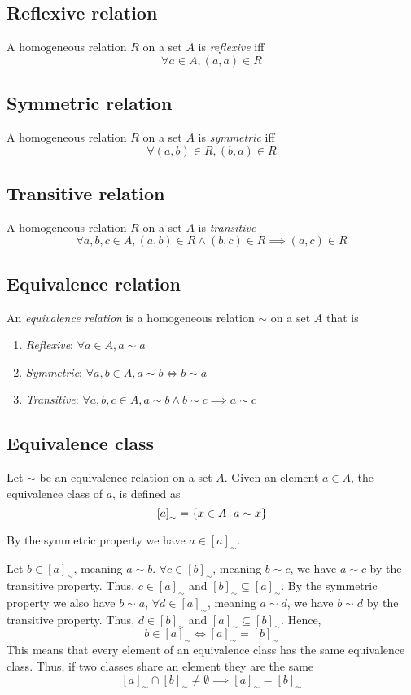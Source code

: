 \documentclass{article}
\begin{document}
\subsection{Reflexive relation}

A homogeneous relation \(R\) on a set \(A\) is \textit{reflexive}
iff
\[
    \forall a\in A, (a,a) \in R
\]

\subsection{Symmetric relation}

A homogeneous relation \(R\) on a set \(A\) is \textit{symmetric}
iff
\[
    \forall (a,b) \in R, (b,a) \in R
\]

\subsection{Transitive relation}

A homogeneous relation \(R\) on a set \(A\) is \textit{transitive}
\[
    \forall a,b,c \in A, (a,b) \in R \land (b,c) \in R \implies (a,c) \in R 
\]

\subsection{Equivalence relation}

An \textit{equivalence relation} is a homogeneous relation \(\sim\) on a set \(A\)
that is
\begin{enumerate}
    \item \textit{Reflexive}: \(\forall a \in A, a \sim a\)
    \item \textit{Symmetric}: \(\forall a,b \in A, a \sim b \iff b \sim a\)
    \item \textit{Transitive}: \(\forall a,b,c \in A, a \sim b \land b \sim c \implies a \sim c\)
\end{enumerate}

\subsection{Equivalence class}

Let \(\sim\) be an equivalence relation on a set \(A\).
Given an element \(a\in A\), the equivalence class of \(a\), is defined as
\[
    {[a]}_{\sim} = \{x \in A \,|\, a \sim x\}
\]

By the symmetric property we have \(a \in {[a]}_{\sim}\).

Let \(b \in {[a]}_{\sim}\), meaning \(a \sim b\). \(\forall c \in {[b]}_{\sim}\),
meaning \(b \sim c\), we have \(a \sim c\) by the transitive property.
Thus, \(c \in {[a]}_{\sim}\) and \({[b]}_{\sim} \subseteq {[a]}_{\sim}\).
By the symmetric property we also have \(b \sim a\),
\(\forall d \in {[a]}_{\sim}\), meaning \(a \sim d\), we have
\(b \sim d\) by the transitive property. Thus, \(d \in {[b]}_{\sim}\)
and \({[a]}_{\sim} \subseteq {[b]}_{\sim}\). Hence,
\[
    b \in {[a]}_{\sim} \iff {[a]}_{\sim} = {[b]}_{\sim}
\]
This means that every element of an equivalence class has the same equivalence class.
Thus, if two classes share an element they are the same
\[
    {[a]}_{\sim} \cap {[b]}_{\sim} \neq \emptyset
    \implies {[a]}_{\sim} = {[b]}_{\sim}
\]
\end{document}
